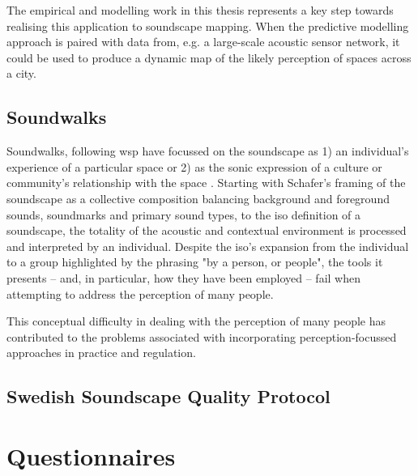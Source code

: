 The empirical and modelling work in this thesis represents a key step towards realising this application to soundscape mapping. When the predictive modelling approach is paired with data from, e.g. a large-scale acoustic sensor network, it could be used to produce a dynamic map of the likely perception of spaces across a city.




\subsection{Soundwalks}
Soundwalks, following \gls{wsp} have focussed on the soundscape as 1) an individual's experience of a particular space or 2) as the sonic expression of a culture or community's relationship with the space \citep{Droumeva2021sound}. Starting with Schafer's framing of the soundscape as a collective composition balancing background and foreground sounds, soundmarks and primary sound types, to the \gls{iso} definition of a soundscape, the totality of the acoustic and contextual environment is processed and interpreted by an individual. Despite the \gls{iso}'s expansion from the individual to a group highlighted by the phrasing "by a person, or people", the tools it presents -- and, in particular, how they have been employed -- fail when attempting to address the perception of many people.

This conceptual difficulty in dealing with the perception of many people has contributed to the problems associated with incorporating perception-focussed approaches in practice and regulation.  %

\subsection{Swedish Soundscape Quality Protocol}


\section{Questionnaires}

